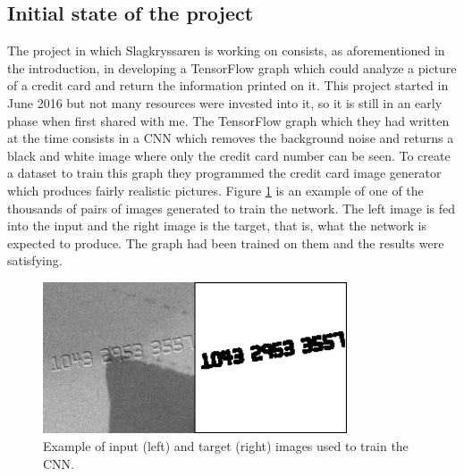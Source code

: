 \subsection{Initial state of the project}
The project in which Slagkryssaren is working on consists, as aforementioned in the introduction, in developing a TensorFlow graph which could analyze a picture of a credit card and return the information printed on it. This project started in June 2016 but not many resources were invested into it, so it is still in an early phase when first shared with me. 
The TensorFlow graph which they had written at the time consists in a CNN which removes the background noise and returns a black and white image where only the credit card number can be seen. To create a dataset to train this graph they programmed the credit card image generator which produces fairly realistic pictures. Figure \ref{fig:removeback} is an example of one of the thousands of pairs of images generated to train the network. The left image is fed into the input and the right image is the target, that is, what the network is expected to produce. The graph had been trained on them and the results were satisfying. \\
\begin{figure}[h]
\centering
  \includegraphics[width=9.0cm]{img/img_target.png}
  \caption{\small Example of input (left) and target (right) images used to train the CNN.}
  \label{fig:removeback}
\end{figure}



